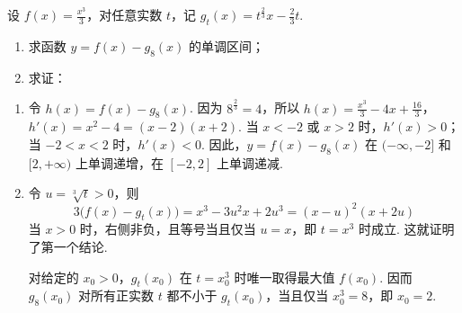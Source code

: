 \begin{problem}
设 \( f(x) = \frac{x^3}{3} \)，对任意实数 \(t\)，记 \(g_t(x) = t^{\frac{2}{3}}x - \frac{2}{3}t\).

\begin{enumerate}
\item 求函数 \(y = f(x) - g_8(x)\) 的单调区间；
\item 求证：
\end{enumerate}
\end{problem}

\begin{solution}
\begin{enumerate}
\item 令 \(h(x)=f(x)-g_8(x)\). 因为 \(8^{\frac{2}{3}}=4\)，所以
\(h(x)=\frac{x^3}{3}-4x+\frac{16}{3}\)，\(h'(x)=x^2-4=(x-2)(x+2)\).
当 \(x<-2\) 或 \(x>2\) 时，\(h'(x)>0\)；当 \(-2<x<2\) 时，\(h'(x)<0\). 因此，\(y=f(x)-g_8(x)\) 在 \((-\infty,-2]\) 和 \([2,+\infty)\) 上单调递增，在 \([-2,2]\) 上单调递减.
\item 令 \(u=\sqrt[3]{t}>0\)，则
\[
3\bigl(f(x)-g_t(x)\bigr)=x^3-3u^2x+2u^3=(x-u)^2(x+2u)
\]
当 \(x>0\) 时，右侧非负，且等号当且仅当 \(u=x\)，即 \(t=x^3\) 时成立. 这就证明了第一个结论.

对给定的 \(x_0>0\)，\(g_t(x_0)\) 在 \(t=x_0^3\) 时唯一取得最大值 \(f(x_0)\). 因而 \(g_8(x_0)\) 对所有正实数 \(t\) 都不小于 \(g_t(x_0)\)，当且仅当 \(x_0^3=8\)，即 \(x_0=2\).
\end{enumerate}
\end{solution}
